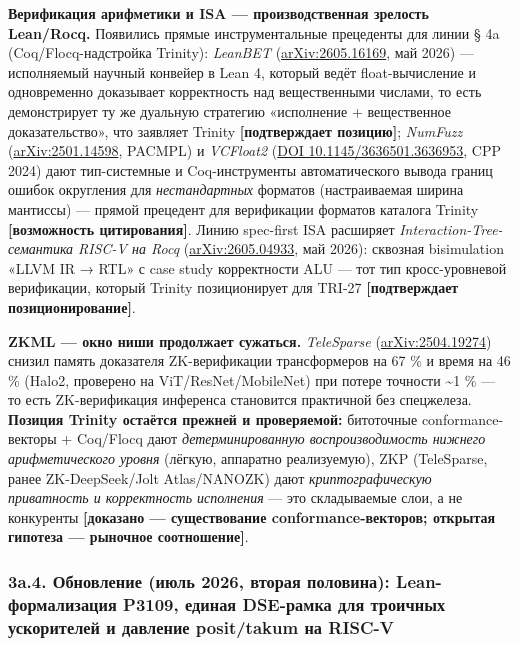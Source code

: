 \documentclass[
  russian,
]{article}
\begin{document}
\textbf{Верификация арифметики и ISA --- производственная зрелость
Lean/Rocq.} Появились прямые инструментальные прецеденты для линии § 4a
(Coq/Flocq-надстройка Trinity): \emph{LeanBET}
(\href{https://arxiv.org/abs/2605.16169}{arXiv:2605.16169}, май 2026)
--- исполняемый научный конвейер в Lean 4, который ведёт
float-вычисление и одновременно доказывает корректность над
вещественными числами, то есть демонстрирует ту же дуальную стратегию
«исполнение + вещественное доказательство», что заявляет Trinity
\textbf{{[}подтверждает позицию{]}}; \emph{NumFuzz}
(\href{https://arxiv.org/abs/2501.14598}{arXiv:2501.14598}, PACMPL) и
\emph{VCFloat2} (\href{https://doi.org/10.1145/3636501.3636953}{DOI
10.1145/3636501.3636953}, CPP 2024) дают тип-системные и Coq-инструменты
автоматического вывода границ ошибок округления для \emph{нестандартных}
форматов (настраиваемая ширина мантиссы) --- прямой прецедент для
верификации форматов каталога Trinity \textbf{{[}возможность
цитирования{]}}. Линию spec-first ISA расширяет
\emph{Interaction-Tree-семантика RISC-V на Rocq}
(\href{https://arxiv.org/abs/2605.04933}{arXiv:2605.04933}, май 2026):
сквозная bisimulation «LLVM IR → RTL» с case study корректности ALU ---
тот тип кросс-уровневой верификации, который Trinity позиционирует для
TRI-27 \textbf{{[}подтверждает позиционирование{]}}.

\textbf{ZKML --- окно ниши продолжает сужаться.} \emph{TeleSparse}
(\href{https://arxiv.org/abs/2504.19274}{arXiv:2504.19274}) снизил
память доказателя ZK-верификации трансформеров на 67 \% и время на 46 \%
(Halo2, проверено на ViT/ResNet/MobileNet) при потере точности
\textasciitilde1 \% --- то есть ZK-верификация инференса становится
практичной без спецжелеза. \textbf{Позиция Trinity остаётся прежней и
проверяемой:} битоточные conformance-векторы + Coq/Flocq дают
\emph{детерминированную воспроизводимость нижнего арифметического
уровня} (лёгкую, аппаратно реализуемую), ZKP (TeleSparse, ранее
ZK-DeepSeek/Jolt Atlas/NANOZK) дают \emph{криптографическую приватность
и корректность исполнения} --- это складываемые слои, а не конкуренты
\textbf{{[}доказано --- существование conformance-векторов; открытая
гипотеза --- рыночное соотношение{]}}.

\subsubsection{3a.4. Обновление (июль 2026, вторая половина):
Lean-формализация P3109, единая DSE-рамка для троичных ускорителей и
давление posit/takum на
RISC-V}\label{a.4.-ux43eux431ux43dux43eux432ux43bux435ux43dux438ux435-ux438ux44eux43bux44c-2026-ux432ux442ux43eux440ux430ux44f-ux43fux43eux43bux43eux432ux438ux43dux430-lean-ux444ux43eux440ux43cux430ux43bux438ux437ux430ux446ux438ux44f-p3109-ux435ux434ux438ux43dux430ux44f-dse-ux440ux430ux43cux43aux430-ux434ux43bux44f-ux442ux440ux43eux438ux447ux43dux44bux445-ux443ux441ux43aux43eux440ux438ux442ux435ux43bux435ux439-ux438-ux434ux430ux432ux43bux435ux43dux438ux435-posittakum-ux43dux430-risc-v}
\end{document}
